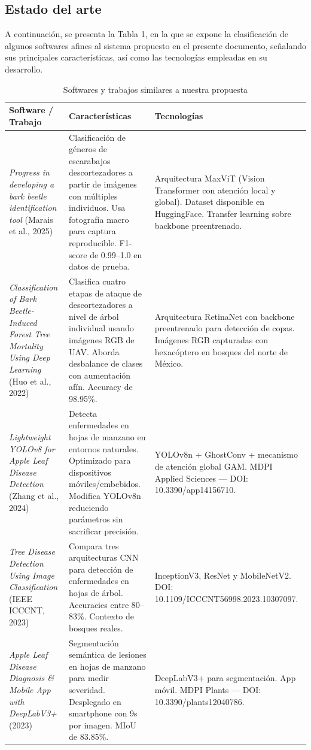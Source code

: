 \subsection{Estado del arte}
A continuación, se presenta la Tabla 1, en la que se expone la clasificación de algunos softwares afines al sistema
propuesto en el presente documento, señalando sus principales características, así como las tecnologías empleadas en
su desarrollo.
\begin{table}[H]
\centering
\caption{Softwares y trabajos similares a nuestra propuesta}
\begin{tabular}{|>{\raggedright\arraybackslash}m{4cm}|>{\raggedright\arraybackslash}m{5cm}|>{\raggedright\arraybackslash}m{5cm}|}
\hline
\textbf{Software / Trabajo} & \textbf{Características} & \textbf{Tecnologías} \\
\hline
\textit{Progress in developing a bark beetle identification tool} (Marais et al., 2025) &
Clasificación de géneros de escarabajos descortezadores a partir de imágenes con múltiples individuos. Usa fotografía macro para captura reproducible. F1-score de 0.99--1.0 en datos de prueba. &
Arquitectura MaxViT (Vision Transformer con atención local y global). Dataset disponible en HuggingFace. Transfer learning sobre backbone preentrenado. \\
\hline
\textit{Classification of Bark Beetle-Induced Forest Tree Mortality Using Deep Learning} (Huo et al., 2022) &
Clasifica cuatro etapas de ataque de descortezadores a nivel de árbol individual usando imágenes RGB de UAV. Aborda desbalance de clases con aumentación afín. Accuracy de 98.95\%. &
Arquitectura RetinaNet con backbone preentrenado para detección de copas. Imágenes RGB capturadas con hexacóptero en bosques del norte de México. \\
\hline
\textit{Lightweight YOLOv8 for Apple Leaf Disease Detection} (Zhang et al., 2024) &
Detecta enfermedades en hojas de manzano en entornos naturales. Optimizado para dispositivos móviles/embebidos. Modifica YOLOv8n reduciendo parámetros sin sacrificar precisión. &
YOLOv8n + GhostConv + mecanismo de atención global GAM. MDPI Applied Sciences — DOI: 10.3390/app14156710. \\
\hline
\textit{Tree Disease Detection Using Image Classification} (IEEE ICCCNT, 2023) &
Compara tres arquitecturas CNN para detección de enfermedades en hojas de árbol. Accuracies entre 80--83\%. Contexto de bosques reales. &
InceptionV3, ResNet y MobileNetV2. DOI: 10.1109/ICCCNT56998.2023.10307097. \\
\hline
\textit{Apple Leaf Disease Diagnosis \& Mobile App with DeepLabV3+} (2023) &
Segmentación semántica de lesiones en hojas de manzano para medir severidad. Desplegado en smartphone con 9s por imagen. MIoU de 83.85\%. &
DeepLabV3+ para segmentación. App móvil. MDPI Plants — DOI: 10.3390/plants12040786. \\
\hline
\end{tabular}
\label{tab:softwares_similares}
\end{table}

